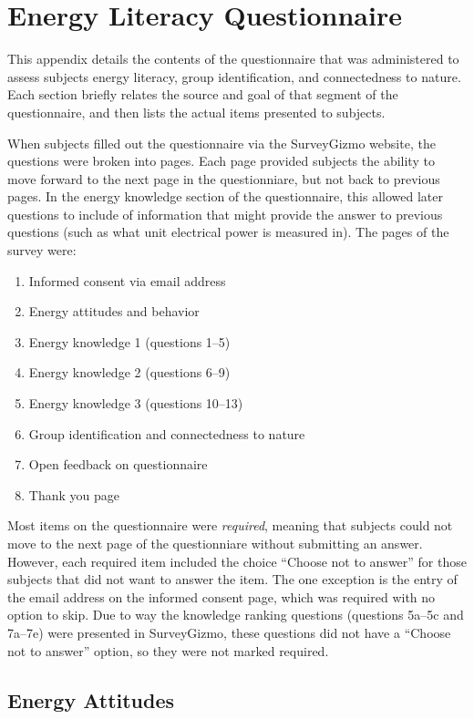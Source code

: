 \chapter{Energy Literacy Questionnaire}
\label{app:energy-literacy}

This appendix details the contents of the questionnaire that was administered to assess subjects energy literacy, group identification, and connectedness to nature. Each section briefly relates the source and goal of that segment of the questionnaire, and then lists the actual items presented to subjects.

When subjects filled out the questionnaire via the SurveyGizmo website, the questions were broken into pages. Each page provided subjects the ability to move forward to the next page in the questionniare, but not back to previous pages. In the energy knowledge section of the questionnaire, this allowed later questions to include of information that might provide the answer to previous questions (such as what unit electrical power is measured in). The pages of the survey were:

\begin{enumerate}
	\item Informed consent via email address
	\item Energy attitudes and behavior
	\item Energy knowledge 1 (questions 1--5)
	\item Energy knowledge 2 (questions 6--9)
	\item Energy knowledge 3 (questions 10--13)
	\item Group identification and connectedness to nature
	\item Open feedback on questionnaire
	\item Thank you page
\end{enumerate}

Most items on the questionnaire were \emph{required}, meaning that subjects could not move to the next page of the questionniare without submitting an answer. However, each required item included the choice ``Choose not to answer'' for those subjects that did not want to answer the item. The one exception is the entry of the email address on the informed consent page, which was required with no option to skip. Due to way the knowledge ranking questions (questions 5a--5c and 7a--7e) were presented in SurveyGizmo, these questions did not have a ``Choose not to answer'' option, so they were not marked required.

\section{Energy Attitudes}
\label{sec:attitude-items}

